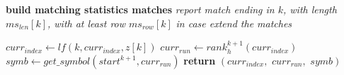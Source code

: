 \documentclass[a4paper,12pt, oneside]{book}
\begin{document}
\begin{algorithm}
\begin{algorithmic}[1]
    \For {\textit{every} $k\in[0,|ms_{row}|)$}
    \Comment \textbf{build matching statistics matches}
    \State \textit{report match ending in $k$, with length $ms_{len}[k]$, with
    at least row $ms_{row}[k]$}
    \EndIf
    \EndFor
    \textit{in case extend the matches}
    \EndFunction
    
  \end{algorithmic}
  \caption{Algoritmo per match con matching-statistics (MS) e LCE}
\end{algorithm}
\begin{algorithm}
  \begin{algorithmic}[1]
    \State $curr_{index}\gets lf(k, curr_{index}, z[k])$
    \State $curr_{run}\gets rank_h^{k+1}(curr_{index})$
    \State $symb\gets get\_symbol(start^{k+1}, curr_{run})$
    \State \textbf{return} $(curr_{index},\,\,curr_{run},\,\,symb)$
    \EndFunction
  \end{algorithmic}
  \caption{Algoritmo per l'update usando le matching statistics} 
\end{algorithm}
\end{document}
